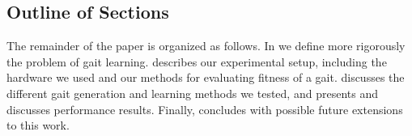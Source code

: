 \subsection{Outline of Sections}

The remainder of the paper is organized as follows. In
 we define more rigorously the problem of
gait learning.  describes our experimental
setup, including the hardware we used and our methods for evaluating
fitness of a gait.  discusses the different gait
generation and learning methods we tested, and 
presents and discusses performance results.  Finally,
 concludes with possible future extensions to this
work.
